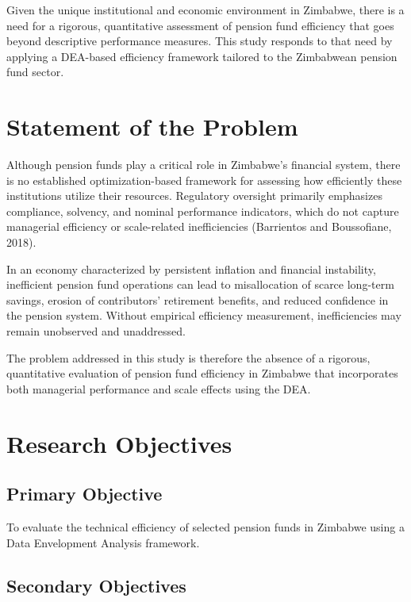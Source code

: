 \documentclass[12pt,a4paper]{article}
\begin{document}
Given the unique institutional and economic environment in Zimbabwe, there is a need for a rigorous, quantitative assessment of pension fund efficiency that goes beyond descriptive performance measures. This study responds to that need by applying a DEA-based efficiency framework tailored to the Zimbabwean pension fund sector.

\section{Statement of the Problem}

Although pension funds play a critical role in Zimbabwe's financial system, there is no established optimization-based framework for assessing how efficiently these institutions utilize their resources. Regulatory oversight primarily emphasizes compliance, solvency, and nominal performance indicators, which do not capture managerial efficiency or scale-related inefficiencies (Barrientos and Boussofiane, 2018).

In an economy characterized by persistent inflation and financial instability, inefficient pension fund operations can lead to misallocation of scarce long-term savings, erosion of contributors' retirement benefits, and reduced confidence in the pension system. Without empirical efficiency measurement, inefficiencies may remain unobserved and unaddressed.

The problem addressed in this study is therefore the absence of a rigorous, quantitative evaluation of pension fund efficiency in Zimbabwe that incorporates both managerial performance and scale effects using the DEA.

\section{Research Objectives}

\subsection{Primary Objective}

To evaluate the technical efficiency of selected pension funds in Zimbabwe using a Data Envelopment Analysis framework.

\subsection{Secondary Objectives}
\end{document}
